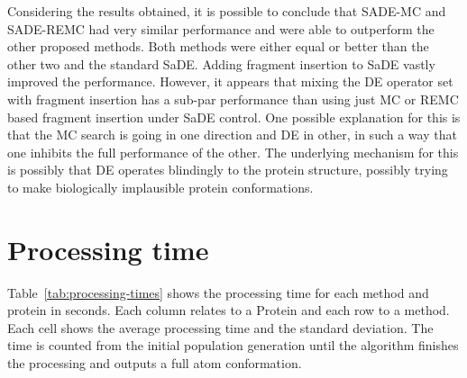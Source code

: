 Considering the results obtained, it is possible to conclude that SADE-MC and SADE-REMC had very similar performance and were able to outperform the other proposed methods. Both methods were either equal or better than the other two and the standard \ac{SaDE}. Adding fragment insertion to \ac{SaDE} vastly improved the performance. However, it appears that mixing the DE operator set with fragment insertion has a sub-par performance than using just MC or REMC based fragment insertion under \ac{SaDE} control. One possible explanation for this is that the MC search is going in one direction and DE in other, in such a way that one inhibits the full performance of the other. The underlying mechanism
for this is possibly that DE operates blindingly to the protein structure, possibly trying to make biologically implausible protein conformations.




\section{Processing time}

Table~\ref{tab:processing-times} shows the processing time for each method and protein in seconds.
Each column relates to a Protein and each row to a method. Each cell shows the average processing
time and the standard deviation. The time is counted from the initial population generation
until the algorithm finishes the processing and outputs a full atom conformation.


